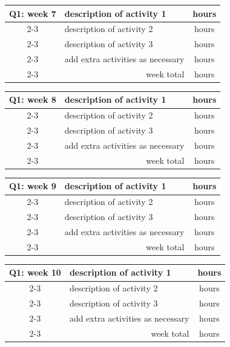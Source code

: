 \documentclass[report,english,cleveref,autoref]{lipics-v2021}
\begin{document}
\begin{tabular}{c| m{10cm}|c}
\hline\hline
Q1: week 7  & description of activity 1 & hours \\
\cline{2-3}
     & description of activity 2 & hours \\
\cline{2-3}
     & description of activity 3 & hours \\
\cline{2-3}
     & add extra activities as necessary & hours \\
\cline{2-3}
     & \multicolumn{1}{r|}{week total} & hours \\
\hline \hline
\end{tabular}
\medskip

\begin{tabular}{c| m{10cm}|c}
\hline\hline
Q1: week 8  & description of activity 1 & hours \\
\cline{2-3}
     & description of activity 2 & hours \\
\cline{2-3}
     & description of activity 3 & hours \\
\cline{2-3}
     & add extra activities as necessary & hours \\
\cline{2-3}
     & \multicolumn{1}{r|}{week total} & hours \\
\hline \hline
\end{tabular}
\medskip

\begin{tabular}{c| m{10cm}|c}
\hline\hline
Q1: week 9  & description of activity 1 & hours \\
\cline{2-3}
     & description of activity 2 & hours \\
\cline{2-3}
     & description of activity 3 & hours \\
\cline{2-3}
     & add extra activities as necessary & hours \\
\cline{2-3}
     & \multicolumn{1}{r|}{week total} & hours \\
\hline \hline
\end{tabular}
\medskip

\begin{tabular}{c| m{10cm}|c}
\hline\hline
Q1: week 10  & description of activity 1 & hours \\
\cline{2-3}
     & description of activity 2 & hours \\
\cline{2-3}
     & description of activity 3 & hours \\
\cline{2-3}
     & add extra activities as necessary & hours \\
\cline{2-3}
     & \multicolumn{1}{r|}{week total} & hours \\
\hline \hline
\end{tabular}
\medskip
\end{document}
